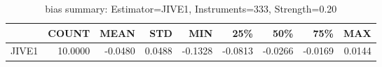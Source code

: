 \begin{table}[ht]
\centering
\caption{bias summary: Estimator=JIVE1, Instruments=333, Strength=0.20}
\begin{tabular}{lrrrrrrrr}
\toprule
 & COUNT & MEAN & STD & MIN & 25\% & 50\% & 75\% & MAX \\
\midrule
JIVE1 & 10.0000 & -0.0480 & 0.0488 & -0.1328 & -0.0813 & -0.0266 & -0.0169 & 0.0144 \\
\bottomrule
\end{tabular}
\end{table}
